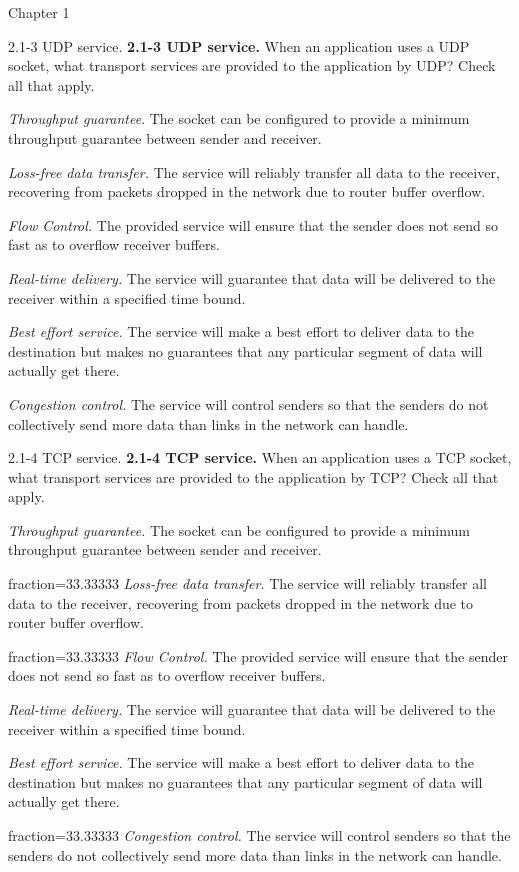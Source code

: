 \documentclass[a4paper]{article}
\begin{document}
\begin{quiz}{Chapter 1}
\begin{multi}[points=1,shuffle,multiple]{2.1-3 UDP service.}
\textbf{2.1-3 UDP service.} When an application uses a UDP socket, what transport services are provided to the application by UDP? Check all that apply.
\item \emph{Throughput guarantee}. The socket can be configured to provide a minimum throughput guarantee between sender and receiver.
\item \emph{Loss-free data transfer.} The service will reliably transfer all data to the receiver, recovering from packets dropped in the network due to router buffer overflow.
\item \emph{Flow Control.} The provided service will ensure that the sender does not send so fast as to overflow receiver buffers.
\item \emph{Real-time delivery.} The service will guarantee that data will be delivered to the receiver within a specified time bound.
\item* \emph{Best effort service. } The service will make a best effort to deliver data to the destination but makes no guarantees that any particular segment of data will actually get there.
\item \emph{Congestion control.}  The service will control senders so that the senders do not collectively send more data than links in the network can handle.
\end{multi}

\begin{multi}[points=1,shuffle,multiple]{2.1-4 TCP service.}
\textbf{2.1-4 TCP service.} When an application uses a TCP socket, what transport services are provided to the application by TCP?  Check all that apply.
\item \emph{Throughput guarantee.} The socket can be configured to provide a minimum throughput guarantee between sender and receiver.
\item[fraction=33.33333] \emph{Loss-free data transfer.} The service will reliably transfer all data to the receiver, recovering from packets dropped in the network due to router buffer overflow.
\item[fraction=33.33333] \emph{Flow Control.} The provided service will ensure that the sender does not send so fast as to overflow receiver buffers.
\item \emph{Real-time delivery.} The service will guarantee that data will be delivered to the receiver within a specified time bound.
\item \emph{Best effort service. } The service will make a best effort to deliver data to the destination but makes no guarantees that any particular segment of data will actually get there.
\item[fraction=33.33333] \emph{Congestion control. } The service will control senders so that the senders do not collectively send more data than links in the network can handle.
\end{multi}


\end{quiz}
\end{document}

